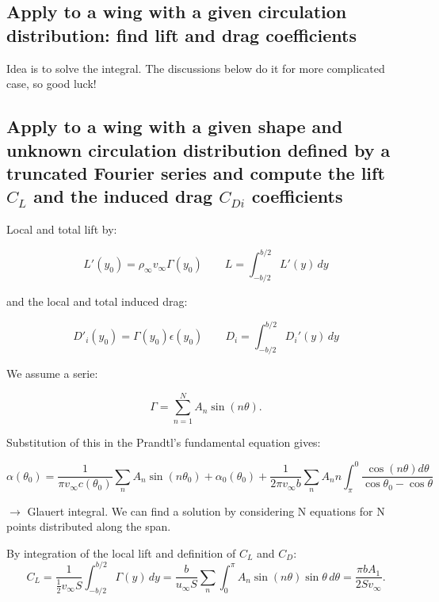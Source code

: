 \documentclass[british,french,11pt, a4paper, openany]{article}
\begin{document}
\subsection{Apply to a wing with a given circulation distribution: find lift and drag coefficients}

Idea is to solve the integral. The discussions below do it for more complicated case, so good luck!

\subsection{Apply to a wing with a given shape and unknown circulation distribution defined
	by a truncated Fourier series and compute the lift $C_L$ and the induced drag $C_{Di}$ coefficients}

Local and total lift by:

\begin{equation}
L'(y_0) = \rho _\infty v_\infty \Gamma (y_0) \qquad L = \int _{-b/2}^{b/2} L'(y)\, dy
\end{equation}

and the local and total induced drag: 

\begin{equation}
D'_i (y_0) = \Gamma (y_0) \epsilon (y_0) \qquad D_i = \int _{-b/2}^{b/2} D_i'(y)\, dy
\end{equation}

We assume a serie:

\begin{equation}
\Gamma = \sum _{n=1} ^N A_n \sin (n\theta).
\end{equation}

Substitution of this in the Prandtl's fundamental equation gives:

\begin{equation}
\alpha (\theta _0) = \frac{1}{\pi v_\infty c(\theta _0)} \sum _n A_n \sin (n\theta_0) + \alpha_0(\theta _0) + \frac{1}{2\pi v_\infty b} \sum _n A_n n \int ^0_\pi \frac{\cos (n\theta)d\theta}{\cos \theta _0 - \cos \theta}
\label{eq:3.32}
\end{equation}

$\rightarrow$ Glauert integral. We can find a solution by considering N equations for N points distributed along the span.

By integration of the local lift and definition of $C_L$ and $C_D$:
\begin{equation}
C_L = \frac{1}{\frac{1}{2}v_\infty S} \int _{-b/2}^{b/2} \Gamma (y) \, dy = \frac{b}{u_\infty S} \sum _n \int _0 ^\pi A_n \sin (n\theta) \sin \theta \, d\theta = \frac{\pi b A_1}{2Sv_\infty}. 
\end{equation}
\end{document}
